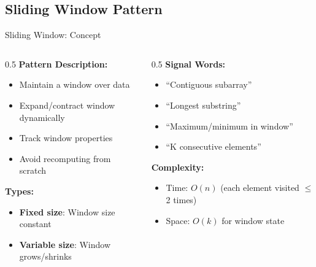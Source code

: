 \documentclass[aspectratio=169,xcolor=dvipsnames]{beamer}
\begin{document}
\subsection{Sliding Window Pattern}

\begin{frame}{Sliding Window: Concept}
  \begin{columns}
    \begin{column}{0.5\textwidth}
      \textbf{Pattern Description:}
      \begin{itemize}
        \item Maintain a window over data
        \item Expand/contract window dynamically
        \item Track window properties
        \item Avoid recomputing from scratch
      \end{itemize}

      \vspace{0.3cm}
      \textbf{Types:}
      \begin{itemize}
        \item \textbf{Fixed size}: Window size constant
        \item \textbf{Variable size}: Window grows/shrinks
      \end{itemize}
    \end{column}

    \begin{column}{0.5\textwidth}
      \textbf{Signal Words:}
      \begin{itemize}
        \item ``Contiguous subarray''
        \item ``Longest substring''
        \item ``Maximum/minimum in window''
        \item ``K consecutive elements''
      \end{itemize}

      \vspace{0.3cm}
      \textbf{Complexity:}
      \begin{itemize}
        \item Time: $O(n)$ (each element visited $\le$ 2 times)
        \item Space: $O(k)$ for window state
      \end{itemize}
    \end{column}
  \end{columns}
\end{frame}
\end{document}
